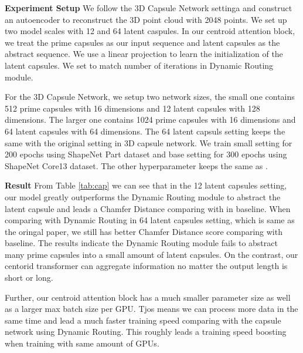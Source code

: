 \documentclass[english]{article}
\begin{document}
\textbf{Experiment Setup} \space We follow the 3D Capsule Network \citep{zhao20193d} settinga and construct an autoencoder to reconstruct the 3D point cloud with 2048 points. We set up two model scales with 12 and 64 latent caspules. In our centroid attention block, we treat the prime capsules as our input sequence and latent capsules as the abstract sequence. We use a linear projection to learn the initialization of the latent capsules. We set  to match number of iterations in Dynamic Routing module.

For the 3D Capsule Network, we setup two network sizes, the small one contains 512 prime capsules with 16 dimensions and 12 latent capsules with 128 dimensions. The larger one contains 1024 prime capsules with 16 dimensions and 64 latent capsules with 64 dimensions. The 64 latent capsuls setting keeps the same with the original setting in 3D capsule network.  We train small setting for 200 epochs using ShapeNet Part dataset and base setting for 300 epochs using ShapeNet Core13 dataset. The other hyperparameter keeps the same as \cite{zhao20193d}.

\textbf{Result} \space From Table \ref{tab:cap} we can see that in the 12 latent capsules setting, our model greatly outperforms the Dynamic Routing module to abstract the latent capsule and leads a Chamfer Distance   comparing with  in baseline.  When comparing with Dynamic Routing in 64 latent capsules setting, which is same as the oringal paper, we still has  better Chamfer Distance score comparing with baseline. The results indicate the Dynamic Routing module fails to abstract many prime capsules into a small amount of latent capsules. On the contrast, our centorid transformer can aggregate information no matter the output length is short or long.

Further, our centroid attention block has a much smaller parameter size as well as a larger max batch size per GPU. Tjos means we can process more data in the same time and lead a much faster training speed comparing with the capsule network using Dynamic Routing. This roughly leads a  training speed boosting when training with same amount of GPUs.
\end{document}
